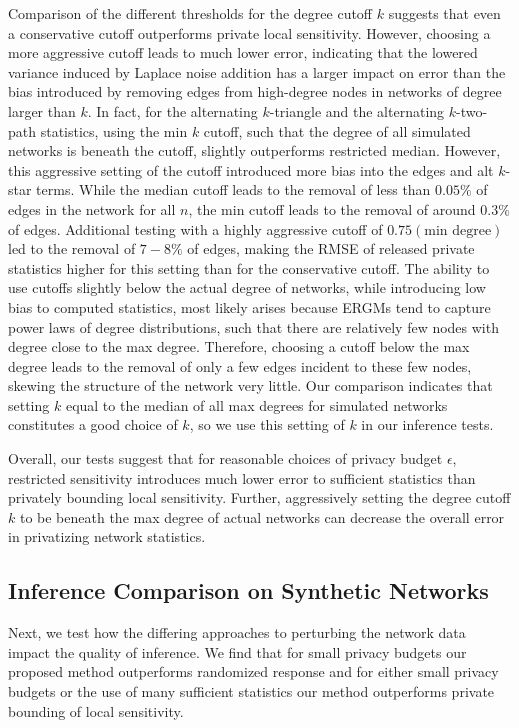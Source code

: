 Comparison of the different thresholds for the degree cutoff $k$ suggests that even a conservative cutoff outperforms private local sensitivity. However, choosing a more aggressive cutoff leads to much lower error, indicating that the lowered variance induced by Laplace noise addition has a larger impact on error than the bias introduced by removing edges from high-degree nodes in networks of degree larger than $k$. In fact, for the alternating $k$-triangle and the alternating $k$-two-path statistics, using the min $k$ cutoff, such that the degree of all simulated networks is beneath the cutoff, slightly outperforms restricted median. However, this aggressive setting of the cutoff introduced more bias into the edges and alt $k$-star terms. While the median cutoff leads to the removal of less than $0.05\%$ of edges in the network for all $n$, the min cutoff leads to the removal of around $0.3\%$ of edges. Additional testing with a highly aggressive cutoff of $0.75(\text{min degree})$ led to the removal of $7-8\%$ of edges, making the RMSE of released private statistics higher for this setting than for the conservative cutoff. The ability to use cutoffs slightly below the actual degree of networks, while introducing low bias to computed statistics, most likely arises because ERGMs tend to capture power laws of degree distributions, such that there are relatively few nodes with degree close to the max degree. Therefore, choosing a cutoff below the max degree leads to the removal of only a few edges incident to these few nodes, skewing the structure of the network very little. Our comparison indicates that setting $k$ equal to the median of all max degrees for simulated networks constitutes a good choice of $k$, so we use this setting of $k$ in our inference tests. 

Overall, our tests suggest that for reasonable choices of privacy budget $\epsilon$, restricted sensitivity introduces much lower error to sufficient statistics than privately bounding local sensitivity. Further, aggressively setting the degree cutoff $k$ to be beneath the max degree of actual networks can decrease the overall error in privatizing network statistics. 

 \subsection{Inference Comparison on Synthetic Networks}
 
 Next, we test how the differing approaches to perturbing the network data impact the quality of inference. We find that for small privacy budgets our proposed method outperforms randomized response and for either small privacy budgets or the use of many sufficient statistics our method outperforms private bounding of local sensitivity. 
 
